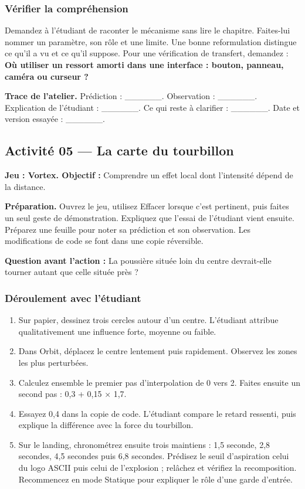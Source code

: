 \documentclass[
  canadien,
  11pt,
  letterpaper,
]{article}
\providecommand{\tightlist}{%
  \setlength{\itemsep}{0pt}\setlength{\parskip}{0pt}}
\begin{document}
\subsubsection{Vérifier la
compréhension}\label{vuxe9rifier-la-compruxe9hension-3}

Demandez à l'étudiant de raconter le mécanisme sans lire le chapitre.
Faites-lui nommer un paramètre, son rôle et une limite. Une bonne
reformulation distingue ce qu'il a vu et ce qu'il suppose. Pour une
vérification de transfert, demandez : \textbf{Où utiliser un ressort
amorti dans une interface : bouton, panneau, caméra ou curseur ?}

\textbf{Trace de l'atelier.} Prédiction : \_\_\_\_\_\_. Observation :
\_\_\_\_\_\_. Explication de l'étudiant : \_\_\_\_\_\_. Ce qui reste à
clarifier : \_\_\_\_\_\_. Date et version essayée : \_\_\_\_\_\_.

\subsection{Activité 05 --- La carte du
tourbillon}\label{activituxe9-05-la-carte-du-tourbillon}

\textbf{Jeu : Vortex. Objectif :} Comprendre un effet local dont
l'intensité dépend de la distance.

\textbf{Préparation.} Ouvrez le jeu, utilisez Effacer lorsque c'est
pertinent, puis faites un seul geste de démonstration. Expliquez que
l'essai de l'étudiant vient ensuite. Préparez une feuille pour noter sa
prédiction et son observation. Les modifications de code se font dans
une copie réversible.

\textbf{Question avant l'action :} La poussière située loin du centre
devrait-elle tourner autant que celle située près ?

\subsubsection{Déroulement avec
l'étudiant}\label{duxe9roulement-avec-luxe9tudiant-4}

\begin{enumerate}
\def\labelenumi{\arabic{enumi}.}
\tightlist
\item
  Sur papier, dessinez trois cercles autour d'un centre. L'étudiant
  attribue qualitativement une influence forte, moyenne ou faible.
\item
  Dans Orbit, déplacez le centre lentement puis rapidement. Observez les
  zones les plus perturbées.
\item
  Calculez ensemble le premier pas d'interpolation de 0 vers 2. Faites
  ensuite un second pas : 0,3 + 0,15 × 1,7.
\item
  Essayez 0,4 dans la copie de code. L'étudiant compare le retard
  ressenti, puis explique la différence avec la force du tourbillon.
\item
  Sur le landing, chronométrez ensuite trois maintiens : 1,5 seconde,
  2,8 secondes, 4,5 secondes puis 6,8 secondes. Prédisez le seuil
  d'aspiration celui du logo ASCII puis celui de l'explosion ; relâchez
  et vérifiez la recomposition. Recommencez en mode Statique pour
  expliquer le rôle d'une garde d'entrée.
\end{enumerate}
\end{document}
